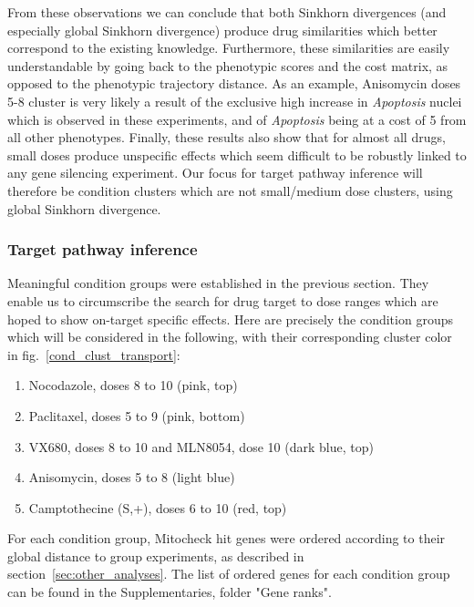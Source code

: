 From these observations we can conclude that both Sinkhorn divergences (and especially global Sinkhorn divergence) produce drug similarities which better correspond to the existing knowledge. Furthermore, these similarities are easily understandable by going back to the phenotypic scores and the cost matrix, as opposed to the phenotypic trajectory distance. As an example, Anisomycin doses 5-8 cluster is very likely a result of the exclusive high increase in \textit{Apoptosis} nuclei which is observed in these experiments, and of \textit{Apoptosis} being at a cost of 5 from all other phenotypes. Finally, these results also show that for almost all drugs, small doses produce unspecific effects which seem difficult to be robustly linked to any gene silencing experiment. Our focus for target pathway inference will therefore be condition clusters which are not small/medium dose clusters, using global Sinkhorn divergence.

\subsubsection{Target pathway inference}
Meaningful condition groups were established in the previous section. They enable us to circumscribe the search for drug target to dose ranges which are hoped to show on-target specific effects. Here are precisely the condition groups which will be considered in the following, with their corresponding cluster color in fig.~\ref{cond_clust_transport}:
\begin{enumerate}
\item Nocodazole, doses 8 to 10 (pink, top)
\item Paclitaxel, doses 5 to 9 (pink, bottom)
\item VX680, doses 8 to 10 and MLN8054, dose 10 (dark blue, top)
\item Anisomycin, doses 5 to 8 (light blue)
\item Camptothecine (S,+), doses 6 to 10 (red, top)
\end{enumerate}

For each condition group, Mitocheck hit genes were ordered according to their global distance to group experiments, as described in section~\ref{sec:other_analyses}. The list of ordered genes for each condition group can be found in the Supplementaries, folder "Gene ranks".

